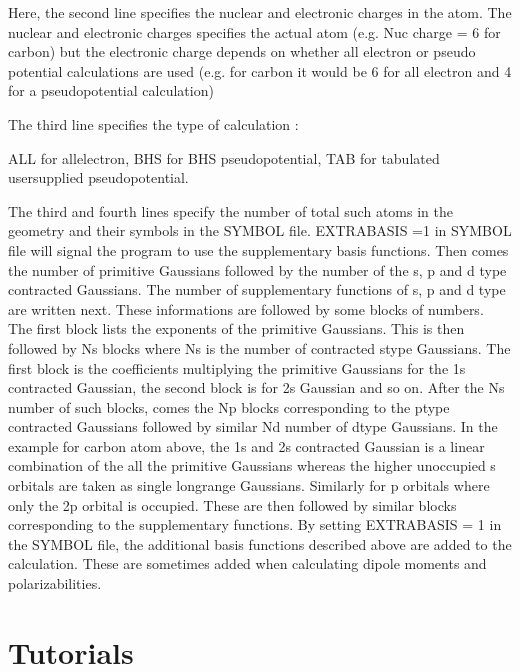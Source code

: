\documentclass[letterpaper,10pt,english,openany,oneside]{sphinxmanual}
\begin{document}
\sphinxAtStartPar
Here, the second line specifies the nuclear and electronic charges in the atom. The nuclear and electronic charges specifies the actual atom (e.g. Nuc charge = 6 for carbon) but the electronic charge depends on whether all electron or pseudo potential calculations are used (e.g. for carbon it would be 6 for all electron and 4 for a pseudopotential calculation)

\sphinxAtStartPar
The third line specifies the type of calculation :

\sphinxAtStartPar
ALL for all\sphinxhyphen{}electron, BHS for BHS pseudopotential, TAB for tabulated user\sphinxhyphen{}supplied pseudopotential.

\sphinxAtStartPar
The third and fourth lines specify the number of total such atoms in the geometry
and their symbols in the SYMBOL file. EXTRABASIS =1 in SYMBOL file will signal
the program to use the supplementary basis functions. Then comes the number of
primitive Gaussians followed by the number of the s, p and d \sphinxhyphen{}type contracted
Gaussians. The number of supplementary functions of s, p and d type are written next.
These informations are followed by some blocks of numbers. The first block lists the
exponents of the primitive Gaussians. This is then followed by Ns blocks where Ns
is the number of contracted s\sphinxhyphen{}type Gaussians. The first block is the coefficients
multiplying the primitive Gaussians for the 1s contracted Gaussian, the second block
is for 2s Gaussian and so on. After the Ns number of such blocks, comes the Np blocks
corresponding to the p\sphinxhyphen{}type contracted Gaussians followed by similar Nd number of d\sphinxhyphen{}type Gaussians. In the example for carbon atom above, the 1s and 2s contracted Gaussian is a linear combination of the all the primitive Gaussians whereas the higher unoccupied s orbitals are taken as single long\sphinxhyphen{}range Gaussians. Similarly for p orbitals where only the 2p orbital is occupied. These are then followed by similar blocks corresponding to the supplementary functions.
By setting EXTRABASIS = 1 in the SYMBOL file, the additional basis functions described above are added to the calculation.  These are sometimes added when calculating dipole moments and polarizabilities.


\chapter{Tutorials}
\label{\detokenize{tutorials/tutrlstoc:tutorials}}\label{\detokenize{tutorials/tutrlstoc::doc}}
\end{document}
